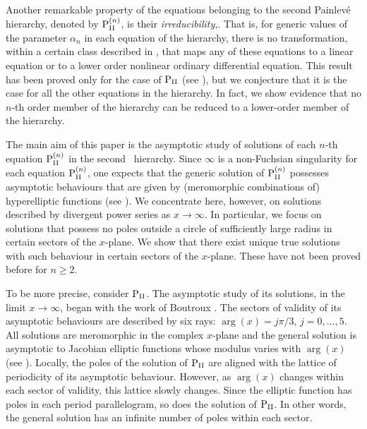 \documentclass{amsart}
\theoremstyle{definition}
\theoremstyle{remark}
\theoremstyle{remark}
\begin{document}
Another remarkable property of the equations belonging to
the second Painlev\'e hierarchy, denoted by ${\rm P}^{(n)}_{\rm{\scriptstyle II}}$, is
their {\it irreducibility,}. That is, for generic values of the parameter
$\alpha_n$ in each equation of the hierarchy,
there is no transformation, within a certain class
described in \cite{Um}, that maps any of these
equations to a linear equation or to a lower order nonlinear ordinary
differential equation. This result has been proved only for the case of
${\rm P}_{\rm{\scriptstyle II}}$ (see \cite{UW}), but
we conjecture that it is the case for all the other equations
in the hierarchy. In fact, we show evidence that no $n$-th
order member of the hierarchy can be reduced to a lower-order
member of the hierarchy.

The main aim of this paper is the asymptotic study of solutions of
each $n$-th equation ${\rm P}^{(n)}_{\rm{\scriptstyle II}}$ in the second \Pa\ hierarchy.
Since $\infty$ is a non-Fuchsian singularity for each equation ${\rm P}^{(n)}_{\rm{\scriptstyle II}}$,
one expects that the generic solution of ${\rm P}^{(n)}_{\rm{\scriptstyle II}}$ possesses asymptotic
behaviours that are given by (meromorphic combinations of)
hyperelliptic functions (see \cite{Li}). We concentrate
here, however, on solutions described by divergent power series
as $x\to\infty$. In particular, we focus on
solutions that possess no poles outside a circle of sufficiently large
radius in certain sectors of the $x$-plane.  We
show that there exist unique true solutions with
such behaviour in certain sectors of the $x$-plane. These have not
been proved before for $n\ge 2$.

To be more precise,
consider ${\rm P}_{\rm{\scriptstyle II}}$.
The asymptotic study of its solutions, in the limit $x\to\infty$, began
with the work of Boutroux \cite{boutroux:I}.
The sectors of validity of its asymptotic behaviours
are described by six rays: $\arg(x)=j\pi/3$, $j=0, \ldots, 5$. All
solutions are meromorphic in the complex $x$-plane and the general
solution is asymptotic to Jacobian elliptic functions
whose modulus varies with $\arg(x)$ (see \cite{njmdk:conn1}).
Locally, the poles of the solution of ${\rm P}_{\rm{\scriptstyle II}}$
are aligned with the lattice of periodicity of its asymptotic behaviour.
However, as $\arg(x)$ changes within each sector of validity,
this lattice slowly changes.
Since the elliptic function has poles in each period parallelogram,
so does the solution of ${\rm P}_{\rm{\scriptstyle II}}$. In other words, the general
solution has an infinite
number of poles within each sector.
\end{document}
